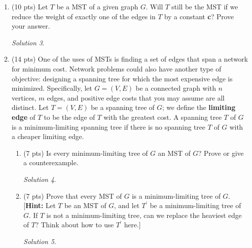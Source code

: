 \documentclass[12pt]{article}
\theoremstyle{remark}
\newtheorem*{solution}{Solution}
\begin{document}
\begin{enumerate}
\begin{enumerate}[label=(\alph*)]
\item (4 pts) In what order would Prim's algorithm add edges to the MST if we start at vertex $A$? 
\begin{solution}

\end{solution}
\pagebreak
\item (7 pts) In what order Kruskal's would add the edges to the MST? For each edge added by Kruskal's sequentially, give a cut that justifies it's addition. 
\begin{solution}

\end{solution}
 

\end{enumerate}

\pagebreak

\item (10 pts) Let $T$ be a MST of a given graph $G$. Will $T$ still be the MST if we reduce the weight of exactly one of the edges in $T$ by a constant \textbf{c}? Prove your answer.
\begin{solution}

\end{solution}

\pagebreak
\item (14 pts) One of the uses of MSTs is finding a set of edges that span a network for minimum cost. Network problems could also have another type of objective: designing a spanning tree for which the most expensive edge is minimized. Specifically, let $G = (V, E)$ be a connected graph with $n$ vertices, $m$ edges, and positive edge costs that you may assume are all distinct. Let $T = (V, E)$ be a spanning tree of $G$; we define the \textbf{limiting edge} of $T$ to be the edge of $T$ with the greatest cost.
A spanning tree $T$ of $G$ is a minimum-limiting spanning tree if there is no spanning tree $T$ of $G$ with a cheaper limiting edge.
\begin{enumerate}
\item (7 pts) Is every minimum-limiting tree of $G$ an MST of $G$? Prove or give a counterexample.
\begin{solution}

\end{solution}

\pagebreak
\item (7 pts) Prove that every MST of $G$ is a minimum-limiting tree of $G$. [\textbf{Hint:} Let $T$ be an MST of $G$, and let $T^{\prime}$ be a minimum-limiting tree of $G$. If $T$ is not a minimum-limiting tree, can we replace the heaviest edge of $T$? Think about how to use $T^{\prime}$ here.]

\begin{solution}

\end{solution}

\end{enumerate}

\end{enumerate}
\end{document}
